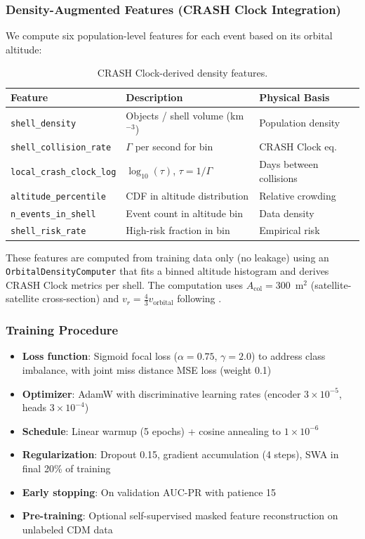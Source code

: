 \documentclass{article}
\begin{document}
\subsubsection{Density-Augmented Features (CRASH Clock Integration)}
\label{sec:density}

We compute six population-level features for each event based on its orbital altitude:

\begin{table}[h]
\centering
\caption{CRASH Clock-derived density features.}
\label{tab:density-features}
\begin{tabular}{@{}lll@{}}
\toprule
Feature & Description & Physical Basis \\
\midrule
\texttt{shell\_density} & Objects / shell volume (km$^{-3}$) & Population density \\
\texttt{shell\_collision\_rate} & $\Gamma$ per second for bin & CRASH Clock eq. \\
\texttt{local\_crash\_clock\_log} & $\log_{10}(\tau)$, $\tau = 1/\Gamma$ & Days between collisions \\
\texttt{altitude\_percentile} & CDF in altitude distribution & Relative crowding \\
\texttt{n\_events\_in\_shell} & Event count in altitude bin & Data density \\
\texttt{shell\_risk\_rate} & High-risk fraction in bin & Empirical risk \\
\bottomrule
\end{tabular}
\end{table}

These features are computed from training data only (no leakage) using an \texttt{OrbitalDensityComputer} that fits a binned altitude histogram and derives CRASH Clock metrics per shell. The computation uses $A_{\text{col}} = 300$~m$^2$ (satellite-satellite cross-section) and $v_r = \frac{4}{3} v_{\text{orbital}}$ following \citet{thiele2025}.

\subsubsection{Training Procedure}
\label{sec:training}

\begin{itemize}
\item \textbf{Loss function}: Sigmoid focal loss ($\alpha = 0.75$, $\gamma = 2.0$) to address class imbalance, with joint miss distance MSE loss (weight 0.1)
\item \textbf{Optimizer}: AdamW with discriminative learning rates (encoder $3\times10^{-5}$, heads $3\times10^{-4}$)
\item \textbf{Schedule}: Linear warmup (5 epochs) + cosine annealing to $1\times10^{-6}$
\item \textbf{Regularization}: Dropout 0.15, gradient accumulation (4 steps), SWA in final 20\% of training
\item \textbf{Early stopping}: On validation AUC-PR with patience 15
\item \textbf{Pre-training}: Optional self-supervised masked feature reconstruction on unlabeled CDM data
\end{itemize}
\end{document}
